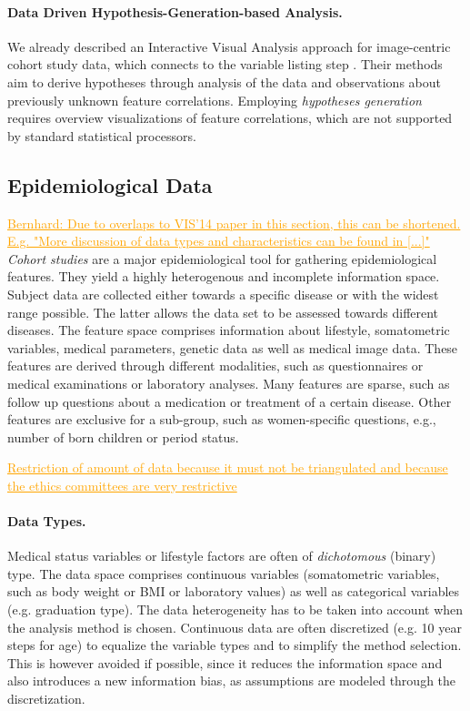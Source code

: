 \documentclass[journal]{style/vgtc} 			          %
\newcommand{\com}[1]{\textcolor{orange}{\uline{#1}}}
\begin{document}
\paragraph{Data Driven Hypothesis-Generation-based Analysis.}
We already described an Interactive Visual Analysis approach for image-centric cohort study data, which connects to the variable listing step \cite{Klemm2014VIS}.
Their methods aim to derive hypotheses through analysis of the data and observations about previously unknown feature correlations.
Employing \emph{hypotheses generation} requires overview visualizations of feature correlations, which are not supported by standard statistical processors.

\subsection{Epidemiological Data} \label{sec:EpidemiologicalData}
\com{Bernhard: Due to overlaps to VIS'14 paper in this section, this can be shortened. E.g. "More discussion of data types and characteristics can be found in [...]"}
\emph{Cohort studies} are a major epidemiological tool for gathering epidemiological features.
They yield a highly heterogenous and incomplete information space.
Subject data are collected either towards a specific disease or with the widest range possible.
The latter allows the data set to be assessed towards different diseases.
The feature space comprises information about lifestyle, somatometric variables, medical parameters, genetic data as well as medical image data.
These features are derived through different modalities, such as questionnaires or medical examinations or laboratory analyses.
Many features are sparse, such as follow up questions about a medication or treatment of a certain disease.
Other features are exclusive for a sub-group, such as women-specific questions, e.g., number of born children or period status.

\com{Restriction of amount of data because it must not be triangulated and because the ethics committees are very restrictive}

\paragraph{Data Types.}
Medical status variables or lifestyle factors are often of \emph{dichotomous} (binary) type.
The data space comprises continuous variables (somatometric variables, such as body weight or BMI or laboratory values) as well as categorical variables (e.g. graduation type).
The data heterogeneity has to be taken into account when the analysis method is chosen.
Continuous data are often discretized (e.g. 10 year steps for age) to equalize the variable types and to simplify the method selection.
This is however avoided if possible, since it reduces the information space and also introduces a new information bias, as assumptions are modeled through the discretization.
\end{document}
